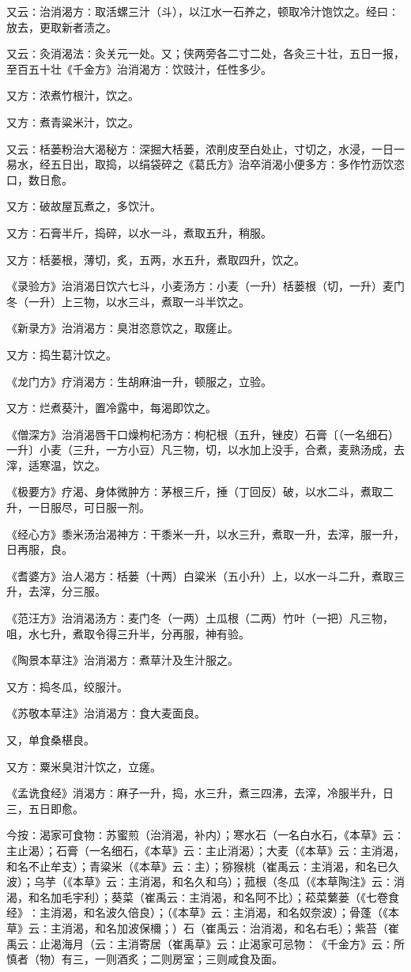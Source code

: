 \documentclass[a4paper,12pt,UTF8,twoside]{ctexbook}
\begin{document}
又云∶治消渴方∶取活螺三汁（斗），以江水一石养之，顿取冷汁饱饮之。经曰∶放去，更取新者渍之。

又云∶灸消渴法∶灸关元一处。又；侠两旁各二寸二处，各灸三十壮，五日一报，至百五十壮《千金方》治消渴方∶饮豉汁，任性多少。

又方∶浓煮竹根汁，饮之。

又方∶煮青粱米汁，饮之。

又云∶栝蒌粉治大渴秘方∶深掘大栝蒌，浓削皮至白处止，寸切之，水浸，一日一易水，经五日出，取捣，以绢袋碎之《葛氏方》治卒消渴小便多方∶多作竹沥饮恣口，数日愈。

又方∶破故屋瓦煮之，多饮汁。

又方∶石膏半斤，捣碎，以水一斗，煮取五升，稍服。

又方∶栝蒌根，薄切，炙，五两，水五升，煮取四升，饮之。

《录验方》治消渴日饮六七斗，小麦汤方∶小麦（一升）栝蒌根（切，一升）麦门冬（一升）上三物，以水三斗，煮取一斗半饮之。

《新录方》治消渴方∶臭泔恣意饮之，取瘥止。

又方∶捣生葛汁饮之。

《龙门方》疗消渴方∶生胡麻油一升，顿服之，立验。

又方∶烂煮葵汁，置冷露中，每渴即饮之。

《僧深方》治消渴唇干口燥枸杞汤方∶枸杞根（五升，锉皮）石膏〔（一名细石）一升〕小麦（三升，一方小豆）凡三物，切，以水加上没手，合煮，麦熟汤成，去滓，适寒温，饮之。

《极要方》疗渴、身体微肿方∶茅根三斤，捶（丁回反）破，以水二斗，煮取二升，一日服尽，可日服一剂。

《经心方》黍米汤治渴神方∶干黍米一升，以水三升，煮取一升，去滓，服一升，日再服，良。

《耆婆方》治人渴方∶栝蒌（十两）白粱米（五小升）上，以水一斗二升，煮取三升，去滓，分三服。

《范汪方》治消渴汤方∶麦门冬（一两）土瓜根（二两）竹叶（一把）凡三物，咀，水七升，煮取令得三升半，分再服，神有验。

《陶景本草注》治消渴方∶煮草汁及生汁服之。

又方∶捣冬瓜，绞服汁。

《苏敬本草注》治消渴方∶食大麦面良。

又，单食桑椹良。

又方∶粟米臭泔汁饮之，立瘥。

《孟诜食经》消渴方∶麻子一升，捣，水三升，煮三四沸，去滓，冷服半升，日三，五日即愈。

今按∶渴家可食物∶苏蜜煎（治消渴，补内）；寒水石（一名白水石，《本草》云∶主止渴）；石膏（一名细石，《本草》云∶主止消渴）；大麦（《本草》云∶主消渴，和名不止牟支）；青粱米（《本草》云∶主）；猕猴桃（崔禹云∶主消渴，和名已久波）；乌芋（《本草》云∶主消渴，和名久和乌）；菰根（冬瓜（《本草陶注》云∶消渴，和名加毛宇利）；葵菜（崔禹云∶主消渴，和名阿不比）；菘菜蘩蒌（《七卷食经》∶主消渴，和名波久倍良）；（《本草》云∶主消渴，和名奴奈波）；骨蓬（《本草》云∶主消渴，和名加波保檷；）石（崔禹云∶治消渴，和名右毛）；紫苔（崔禹云∶止渴海月（云∶主消寄居（崔禹草》云∶止渴家可忌物∶《千金方》云∶所慎者（物）有三，一则酒炙；二则房室；三则咸食及面。
\end{document}

